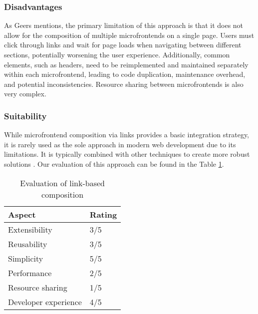 \subsubsection{Disadvantages}
As Geers \cite{Geers} mentions, the primary limitation of this approach is that it does not allow for the composition of multiple microfrontends on a single page. Users must click through links and wait for page loads when navigating between different sections, potentially worsening the user experience. Additionally, common elements, such as headers, need to be reimplemented and maintained separately within each microfrontend, leading to code duplication, maintenance overhead, and potential inconsistencies. Resource sharing between microfrontends is also very complex. 

\subsubsection{Suitability}
While microfrontend composition via links provides a basic integration strategy, it is rarely used as the sole approach in modern web development due to its limitations. It is typically combined with other techniques to create more robust solutions \cite{Geers}. Our evaluation of this approach can be found in the Table \ref{table:link-evaluation}.
\begin{table}[h]
  \centering
  \begin{tabular}{|l|l|}
    \hline
      \textbf{Aspect} & \textbf{Rating} \\
    \hline
      Extensibility & 3/5 \\
    \hline
      Reusability & 3/5 \\
    \hline
      Simplicity & 5/5 \\
    \hline
      Performance & 2/5 \\
    \hline
      Resource sharing & 1/5 \\
    \hline
      Developer experience & 4/5 \\
    \hline
  \end{tabular}
  \caption{Evaluation of link-based composition}
  \label{table:link-evaluation}
\end{table}


